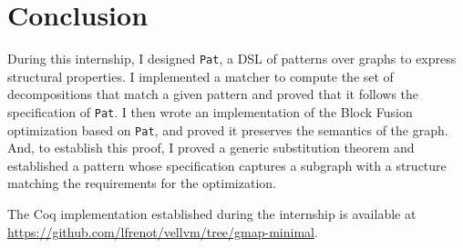 \documentclass[11pt]{article}
\newcommand{\pat}{\texttt{Pat}\xspace}
\begin{document}






\section{Conclusion}
\label{sec:ccl}

During this internship, I designed \pat, a DSL of patterns over graphs to express structural properties. I implemented a matcher to compute the set of decompositions that match a given pattern and proved that it follows the specification of \pat.
I then wrote an implementation of the Block Fusion optimization based on \pat, and proved it preserves the semantics of the graph. And, to establish this proof, I proved a generic substitution theorem and established a pattern whose specification captures a subgraph with a structure matching the requirements for the optimization.

The Coq implementation established during the internship is available at \url{https://github.com/lfrenot/vellvm/tree/gmap-minimal}.

\printbibliography
\end{document}
